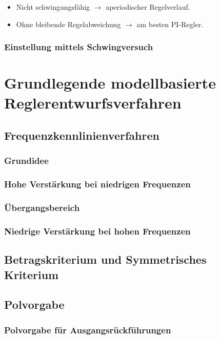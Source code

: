 \documentclass[12pt]{article}
\begin{document}
\begin{itemize}
	\item Nicht schwingungsfähig \(\rightarrow\) aperiodischer Regelverlauf.\footnotemark
	\item Ohne bleibende Regelabweichung \(\rightarrow\) am besten PI-Regler.\footnotemark
\end{itemize}
\subsubsection{Einstellung mittels Schwingversuch}

\clearpage
\section{Grundlegende modellbasierte Reglerentwurfsverfahren}
\subsection{Frequenzkennlinienverfahren}
\subsubsection{Grundidee}
\subsubsection{Hohe Verstärkung bei niedrigen Frequenzen}
\subsubsection{Übergangsbereich}
\subsubsection{Niedrige Verstärkung bei hohen Frequenzen}
\subsection{Betragskriterium und Symmetrisches Kriterium}
\subsection{Polvorgabe}
\subsubsection{Polvorgabe für Ausgangsrückführungen}
\end{document}
